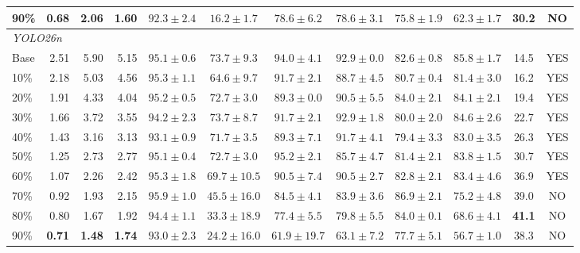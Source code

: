 \documentclass[conference]{IEEEtran}
\begin{document}
\begin{table}[!t]
\begin{tabular}{l rrr c cccc c c c}
90\%  & \textbf{0.68} & \textbf{2.06} & \textbf{1.60} & $92.3\pm2.4$ & $16.2\pm1.7$ & $78.6\pm6.2$ & $78.6\pm3.1$ & $75.8\pm1.9$ & $62.3\pm1.7$ & 30.2 & NO \\
\midrule
\multicolumn{12}{l}{\textit{YOLO26n}} \\
Base  & 2.51 & 5.90 & 5.15 & $95.1\pm0.6$ & $\mathbf{73.7}\pm\mathbf{9.3}$ & $94.0\pm4.1$ & $\mathbf{92.9}\pm\mathbf{0.0}$ & $82.6\pm0.8$ & $\mathbf{85.8}\pm\mathbf{1.7}$ & 14.5 & YES \\
10\%  & 2.18 & 5.03 & 4.56 & $95.3\pm1.1$ & $64.6\pm9.7$ & $91.7\pm2.1$ & $88.7\pm4.5$ & $80.7\pm0.4$ & $81.4\pm3.0$ & 16.2 & YES \\
20\%  & 1.91 & 4.33 & 4.04 & $95.2\pm0.5$ & $72.7\pm3.0$ & $89.3\pm0.0$ & $90.5\pm5.5$ & $84.0\pm2.1$ & $84.1\pm2.1$ & 19.4 & YES \\
30\%  & 1.66 & 3.72 & 3.55 & $94.2\pm2.3$ & $\mathbf{73.7}\pm\mathbf{8.7}$ & $91.7\pm2.1$ & $\mathbf{92.9}\pm\mathbf{1.8}$ & $80.0\pm2.0$ & $84.6\pm2.6$ & 22.7 & YES \\
40\%  & 1.43 & 3.16 & 3.13 & $93.1\pm0.9$ & $71.7\pm3.5$ & $89.3\pm7.1$ & $91.7\pm4.1$ & $79.4\pm3.3$ & $83.0\pm3.5$ & 26.3 & YES \\
50\%  & 1.25 & 2.73 & 2.77 & $95.1\pm0.4$ & $72.7\pm3.0$ & $\mathbf{95.2}\pm\mathbf{2.1}$ & $85.7\pm4.7$ & $81.4\pm2.1$ & $83.8\pm1.5$ & 30.7 & YES \\
60\%  & 1.07 & 2.26 & 2.42 & $95.3\pm1.8$ & $69.7\pm10.5$ & $90.5\pm7.4$ & $90.5\pm2.7$ & $82.8\pm2.1$ & $83.4\pm4.6$ & 36.9 & YES \\
70\%  & 0.92 & 1.93 & 2.15 & $\mathbf{95.9}\pm\mathbf{1.0}$ & $45.5\pm16.0$ & $84.5\pm4.1$ & $83.9\pm3.6$ & $\mathbf{86.9}\pm\mathbf{2.1}$ & $75.2\pm4.8$ & 39.0 & NO \\
80\%  & 0.80 & 1.67 & 1.92 & $94.4\pm1.1$ & $33.3\pm18.9$ & $77.4\pm5.5$ & $79.8\pm5.5$ & $84.0\pm0.1$ & $68.6\pm4.1$ & \textbf{41.1} & NO \\
90\%  & \textbf{0.71} & \textbf{1.48} & \textbf{1.74} & $93.0\pm2.3$ & $24.2\pm16.0$ & $61.9\pm19.7$ & $63.1\pm7.2$ & $77.7\pm5.1$ & $56.7\pm1.0$ & 38.3 & NO \\
\bottomrule
\end{tabular}
\end{table}
\end{document}
